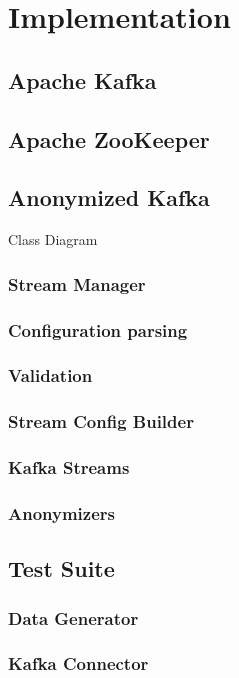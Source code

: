 \chapter{Implementation\label{cha:chapter4}}

\section{Apache Kafka}

\section{Apache ZooKeeper}

\section{Anonymized Kafka}
Class Diagram
\subsection{Stream Manager}
\subsection{Configuration parsing}
\subsection{Validation}
\subsection{Stream Config Builder}
\subsection{Kafka Streams}
\subsection{Anonymizers}

\section{Test Suite}
\subsection{Data Generator}
\subsection{Kafka Connector}
